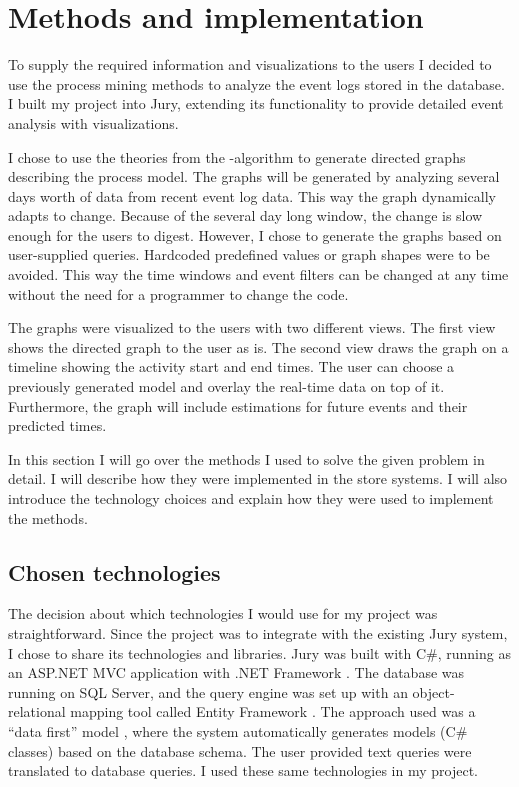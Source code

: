 
\clearpage
\section{Methods and implementation}

To supply the required information and visualizations to the users I decided to use the process mining methods to analyze the event logs stored in the database.
I built my project into Jury, extending its functionality to provide detailed event analysis with visualizations.

I chose to use the theories from the \textalpha-algorithm to generate directed graphs describing the process model.
The graphs will be generated by analyzing several days worth of data from recent event log data. 
This way the graph dynamically adapts to change. 
Because of the several day long window, the change is slow enough for the users to digest. 
However, I chose to generate the graphs based on user-supplied queries.
Hardcoded predefined values or graph shapes were to be avoided.
This way the time windows and event filters can be changed at any time without the need for a programmer to change the code.

The graphs were visualized to the users with two different views. 
The first view shows the directed graph to the user as is. 
The second view draws the graph on a timeline showing the activity start and end times.
The user can choose a previously generated model and overlay the real-time data on top of it.
Furthermore, the graph will include estimations for future events and their predicted times.

In this section I will go over the methods I used to solve the given problem in detail.
I will describe how they were implemented in the store systems.
I will also introduce the technology choices and explain how they were used to implement the methods.

\subsection{Chosen technologies}

The decision about which technologies I would use for my project was straightforward.
Since the project was to integrate with the existing Jury system, I chose to share its technologies and libraries.
Jury was built with C\#, running as an ASP.NET MVC application with .NET Framework \cite{aspnetmvc}.
The database was running on SQL Server, and the query engine was set up with an object-relational mapping tool called Entity Framework \cite{entityframework}.
The approach used was a ``data first'' model \cite{efdatafirst}, where the system automatically generates models (C\# classes) based on the database schema.
The user provided text queries were translated to database queries.
I used these same technologies in my project.

